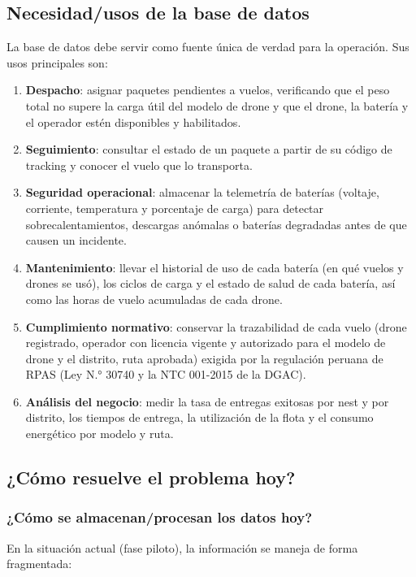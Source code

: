 \documentclass[11pt,a4paper]{article}
\begin{document}
\subsection{Necesidad/usos de la base de datos}
La base de datos debe servir como fuente única de verdad para la operación. Sus usos principales son:

\begin{enumerate}
\item \textbf{Despacho}: asignar paquetes pendientes a vuelos, verificando que el peso total no supere la carga útil del modelo de drone y que el drone, la batería y el operador estén disponibles y habilitados.
\item \textbf{Seguimiento}: consultar el estado de un paquete a partir de su código de tracking y conocer el vuelo que lo transporta.
\item \textbf{Seguridad operacional}: almacenar la telemetría de baterías (voltaje, corriente, temperatura y porcentaje de carga) para detectar sobrecalentamientos, descargas anómalas o baterías degradadas antes de que causen un incidente.
\item \textbf{Mantenimiento}: llevar el historial de uso de cada batería (en qué vuelos y drones se usó), los ciclos de carga y el estado de salud de cada batería, así como las horas de vuelo acumuladas de cada drone.
\item \textbf{Cumplimiento normativo}: conservar la trazabilidad de cada vuelo (drone registrado, operador con licencia vigente y autorizado para el modelo de drone y el distrito, ruta aprobada) exigida por la regulación peruana de RPAS (Ley N.° 30740 y la NTC 001-2015 de la DGAC).
\item \textbf{Análisis del negocio}: medir la tasa de entregas exitosas por nest y por distrito, los tiempos de entrega, la utilización de la flota y el consumo energético por modelo y ruta.
\end{enumerate}

\subsection{¿Cómo resuelve el problema hoy?}

\subsubsection{¿Cómo se almacenan/procesan los datos hoy?}
En la situación actual (fase piloto), la información se maneja de forma fragmentada:
\end{document}
